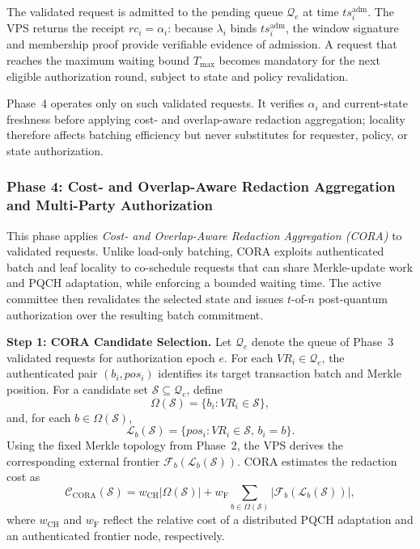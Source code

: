 \documentclass[lettersize,journal]{IEEEtran}
\begin{document}
The validated request is admitted to the pending queue
$\mathcal{Q}_e$ at time $ts_i^{\mathrm{adm}}$. The VPS returns
\textcolor{e2}{the receipt $rc_i=\alpha_i$: because $\lambda_i$ binds
$ts_i^{\mathrm{adm}}$, the window signature and membership proof}
provide verifiable evidence of admission. A request that reaches
the maximum waiting bound $T_{\max}$ becomes mandatory for the next
eligible authorization round, subject to state and policy revalidation.

Phase~4 operates only on such validated requests. It verifies
$\alpha_i$ and current-state freshness before applying
cost- and overlap-aware redaction aggregation; locality therefore
affects batching efficiency but never substitutes for requester,
policy, or state authorization.
    
    
  \subsubsection*{\textbf{Phase 4: Cost- and Overlap-Aware Redaction
Aggregation and Multi-Party Authorization}}

This phase applies \emph{Cost- and Overlap-Aware Redaction Aggregation
(CORA)} to validated requests. Unlike load-only batching, CORA exploits
authenticated batch and leaf locality to co-schedule requests that can
share Merkle-update work and PQCH adaptation, while enforcing a bounded
waiting time. The active committee then revalidates the selected state
and issues $t$-of-$n$ post-quantum authorization over the resulting
batch commitment.

\medskip
\noindent\textbf{Step 1: CORA Candidate Selection.}
Let $\mathcal{Q}_e$ denote the queue of Phase~3 validated requests for
authorization epoch $e$. For each $VR_i\in\mathcal{Q}_e$, the authenticated
pair $(b_i,pos_i)$ identifies its target transaction batch and Merkle
position. For a candidate set $\mathcal{S}\subseteq\mathcal{Q}_e$, define
\begin{equation}
\Omega(\mathcal{S})
=
\{b_i:VR_i\in\mathcal{S}\},
\end{equation}
and, for each $b\in\Omega(\mathcal{S})$,
\begin{equation}
\mathcal{L}_b(\mathcal{S})
=
\{pos_i:VR_i\in\mathcal{S},\,b_i=b\}.
\end{equation}
Using the fixed Merkle topology from Phase~2, the VPS derives the
corresponding external frontier
$\mathcal{F}_b(\mathcal{L}_b(\mathcal{S}))$. CORA estimates the
redaction cost as
\begin{equation}
\mathcal{C}_{\mathrm{CORA}}(\mathcal{S})
=
w_{\mathrm{CH}}|\Omega(\mathcal{S})|
+
w_{\mathrm{F}}
\sum_{b\in\Omega(\mathcal{S})}
|\mathcal{F}_b(\mathcal{L}_b(\mathcal{S}))|,
\end{equation}
where $w_{\mathrm{CH}}$ and $w_{\mathrm{F}}$ reflect the relative cost
of a distributed PQCH adaptation and an authenticated frontier node,
respectively.
\end{document}
